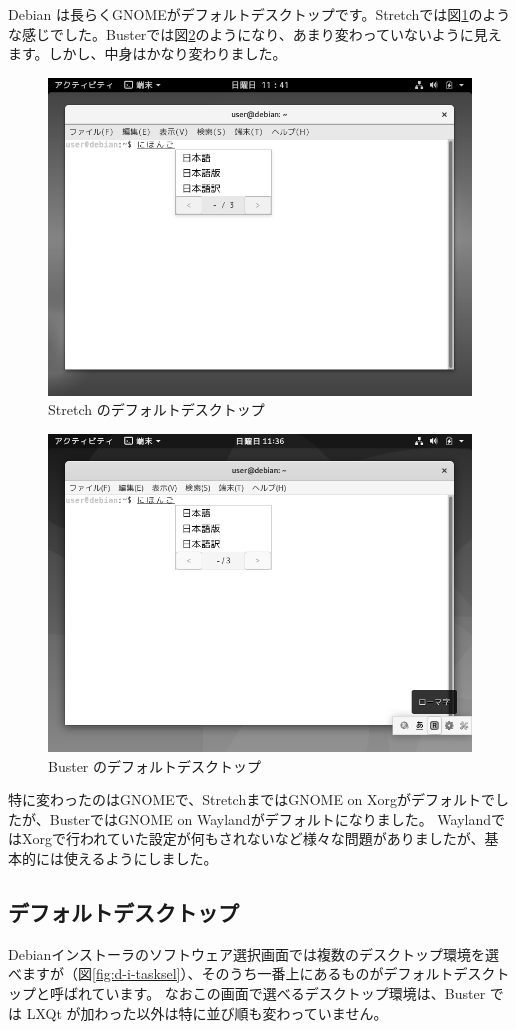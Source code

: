 \documentclass[mingoth,a4paper]{jsarticle}
\begin{document}
Debian は長らくGNOMEがデフォルトデスクトップです。Stretchでは図\ref{fig:desktop-stretch}のような感じでした。Busterでは図\ref{fig:desktop-buster}のようになり、あまり変わっていないように見えます。しかし、中身はかなり変わりました。

\begin{figure}[h]
\begin{center}
\includegraphics[keepaspectratio,width=0.45\hsize]{image201907/stretch_gnome_3_gray.png}
\end{center}
\caption{Stretch のデフォルトデスクトップ}
\label{fig:desktop-stretch}
\end{figure}

\begin{figure}[h]
\begin{center}
\includegraphics[keepaspectratio,width=0.45\hsize]{image201907/buster_gnome_3_gray.png}
\end{center}
\caption{Buster のデフォルトデスクトップ}
\label{fig:desktop-buster}
\end{figure}

特に変わったのはGNOMEで、StretchまではGNOME on Xorgがデフォルトでしたが、BusterではGNOME on Waylandがデフォルトになりました。
WaylandではXorgで行われていた設定が何もされないなど様々な問題がありましたが、基本的には使えるようにしました。

\subsection{デフォルトデスクトップ}
Debianインストーラのソフトウェア選択画面では複数のデスクトップ環境を選べますが（図\ref{fig:d-i-tasksel}）、そのうち一番上にあるものがデフォルトデスクトップと呼ばれています。
なおこの画面で選べるデスクトップ環境は、Buster では LXQt が加わった以外は特に並び順も変わっていません。
\end{document}
